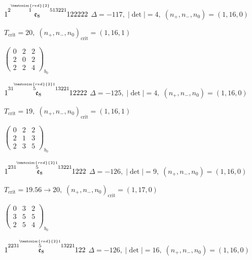 \documentclass[10pt]{article}
\begin{document}
\smallskip

$1\overset{2\overset{\textcolor{red}{2}}{1}513221}{\mathfrak{e}_8}122222$ \quad $\Delta=-117,\; |\det|=4,\; (n_+,n_-,n_0)=(1,16,0)$

\hspace{1em}$T_{\text{crit}}=20,\; (n_+,n_-,n_0)_{\text{crit}}=(1,16,1)$

\hspace{2em}$\left(\begin{smallmatrix}0 & 2 & 2 \\ 2 & 0 & 2 \\ 2 & 2 & 4\end{smallmatrix}\right)_{\!b_0}$

\smallskip

$1\overset{31\overset{\textcolor{red}{2}1}{5}13221}{\mathfrak{e}_8}12222$ \quad $\Delta=-125,\; |\det|=4,\; (n_+,n_-,n_0)=(1,16,0)$

\hspace{1em}$T_{\text{crit}}=19,\; (n_+,n_-,n_0)_{\text{crit}}=(1,16,1)$

\hspace{2em}$\left(\begin{smallmatrix}0 & 2 & 2 \\ 2 & 1 & 3 \\ 2 & 3 & 5\end{smallmatrix}\right)_{\!b_0}$

\smallskip

$1\overset{231\overset{\textcolor{red}{2}1}{5}13221}{\mathfrak{e}_8}1222$ \quad $\Delta=-126,\; |\det|=9,\; (n_+,n_-,n_0)=(1,16,0)$

\hspace{1em}$T_{\text{crit}}=19.56 \to 20,\; (n_+,n_-,n_0)_{\text{crit}}=(1,17,0)$

\hspace{2em}$\left(\begin{smallmatrix}0 & 3 & 2 \\ 3 & 5 & 5 \\ 2 & 5 & 4\end{smallmatrix}\right)_{\!b_0}$

\smallskip

$1\overset{2231\overset{\textcolor{red}{2}1}{5}13221}{\mathfrak{e}_8}122$ \quad $\Delta=-126,\; |\det|=16,\; (n_+,n_-,n_0)=(1,16,0)$
\end{document}
